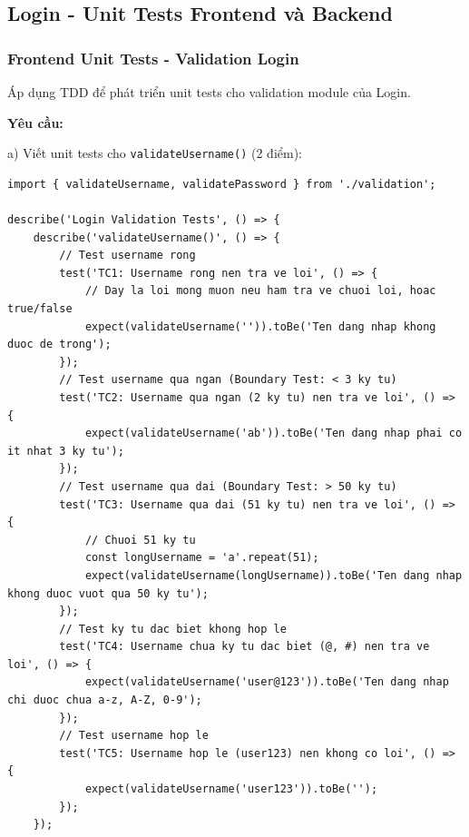 \documentclass[a4paper,12pt]{article}
\begin{document}
\subsection{Login - Unit Tests Frontend và Backend}

\subsubsection{ Frontend Unit Tests - Validation Login}

Áp dụng TDD để phát triển unit tests cho validation module của Login.

\textbf{Yêu cầu:}

a) Viết unit tests cho \texttt{validateUsername()} (2 điểm):

\begin{tcolorbox}[breakable, colback=green!5,colframe=black!50,title=validation.test.js]
\begin{lstlisting}
import { validateUsername, validatePassword } from './validation';

describe('Login Validation Tests', () => {
    describe('validateUsername()', () => {
        // Test username rong
        test('TC1: Username rong nen tra ve loi', () => {
            // Day la loi mong muon neu ham tra ve chuoi loi, hoac true/false
            expect(validateUsername('')).toBe('Ten dang nhap khong duoc de trong');
        });
        // Test username qua ngan (Boundary Test: < 3 ky tu)
        test('TC2: Username qua ngan (2 ky tu) nen tra ve loi', () => {
            expect(validateUsername('ab')).toBe('Ten dang nhap phai co it nhat 3 ky tu');
        });
        // Test username qua dai (Boundary Test: > 50 ky tu)
        test('TC3: Username qua dai (51 ky tu) nen tra ve loi', () => {
            // Chuoi 51 ky tu
            const longUsername = 'a'.repeat(51);
            expect(validateUsername(longUsername)).toBe('Ten dang nhap khong duoc vuot qua 50 ky tu');
        });
        // Test ky tu dac biet khong hop le
        test('TC4: Username chua ky tu dac biet (@, #) nen tra ve loi', () => {
            expect(validateUsername('user@123')).toBe('Ten dang nhap chi duoc chua a-z, A-Z, 0-9');
        });
        // Test username hop le
        test('TC5: Username hop le (user123) nen khong co loi', () => {
            expect(validateUsername('user123')).toBe('');
        });
    });
\end{lstlisting}
\end{tcolorbox}
\end{document}
